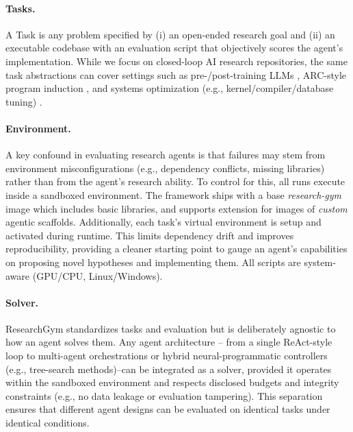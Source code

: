 \documentclass[11pt]{article}
\let\cite\citep
\theoremstyle{plain}
\theoremstyle{definition}
\theoremstyle{remark}
\begin{document}
\paragraph{Tasks.}
A Task is any problem specified by (i) an open-ended research goal and (ii) an executable codebase with an evaluation script that objectively scores the agent’s implementation. While we focus on closed-loop AI research repositories, the same task abstractions can cover settings such as pre-/post-training LLMs \cite{si2026executiongroundedautomatedairesearch, posttrainbench_2025}, ARC-style program induction \cite{lee2024arcleabstractionreasoningcorpus}, and systems optimization (e.g., kernel/compiler/database tuning) \cite{ouyang2025kernelbenchllmswriteefficient, cheng2025barbariansgateaiupending, cheng2025letbarbariansinai}. 



\paragraph{Environment.}
A key confound in evaluating research agents is that failures may stem from environment misconfigurations (e.g.,
  dependency conflicts, missing libraries) rather than from the agent's research ability.
To control for this, all runs execute inside a sandboxed environment. The framework ships with a base \emph{research-gym} image which includes basic libraries, and supports extension for images of \emph{custom} agentic scaffolds. Additionally, each task's virtual environment is setup and activated during runtime. This limits
dependency drift and improves reproducibility,
providing a cleaner starting point to gauge an agent's capabilities on proposing novel hypotheses and implementing them. All scripts are system-aware (GPU/CPU, Linux/Windows).

\paragraph{Solver.}
ResearchGym standardizes tasks and evaluation but is deliberately agnostic to how an agent solves them. 
Any agent architecture -- from a single ReAct-style loop to multi-agent orchestrations or hybrid neural-programmatic controllers (e.g.,
  tree-search methods)--can be integrated as a solver, provided it operates within the sandboxed environment and respects disclosed
  budgets and integrity constraints (e.g., no data leakage or evaluation tampering).
This separation ensures that different agent designs can be evaluated on identical tasks under identical conditions.
\end{document}
